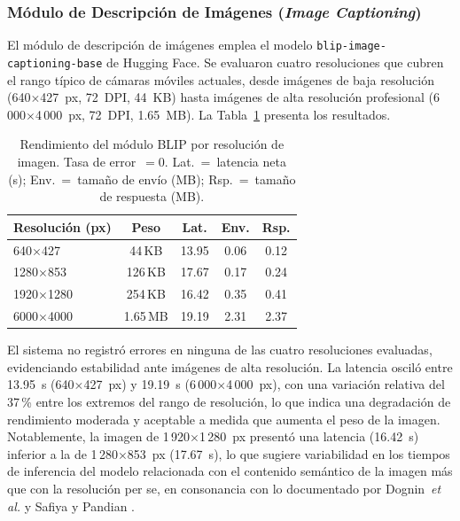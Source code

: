 \documentclass[journal]{IEEEtran}
\begin{document}
	\subsubsection{M\'odulo de Descripci\'on de Im\'agenes (\textit{Image Captioning})}
	El m\'odulo de descripci\'on de im\'agenes emplea el modelo \texttt{blip-image-captioning-base} de Hugging Face. Se evaluaron cuatro resoluciones que cubren el rango t\'ipico de c\'amaras m\'oviles actuales, desde im\'agenes de baja resoluci\'on (640$\times$427~px, 72~DPI, 44~KB) hasta im\'agenes de alta resoluci\'on profesional (6\,000$\times$4\,000~px, 72~DPI, 1.65~MB). La Tabla~\ref{tab:img} presenta los resultados.
	
	\begin{table}[!t]
		\caption{Rendimiento del m\'odulo BLIP por resoluci\'on de imagen. Tasa de error~$= 0$. Lat.~=~latencia neta (s); Env.~=~tama\~no de env\'io (MB); Rsp.~=~tama\~no de respuesta (MB).}
		\label{tab:img}
		\centering
		\renewcommand{\arraystretch}{1.25}
		\begin{tabular}{p{1.9cm}cccc}
			\toprule
			\textbf{Resoluci\'on (px)} & \textbf{Peso} & \textbf{Lat.} & \textbf{Env.} & \textbf{Rsp.} \\
			\midrule
			640$\times$427   & 44\,KB   & 13.95 & 0.06 & 0.12 \\
			1280$\times$853  & 126\,KB  & 17.67 & 0.17 & 0.24 \\
			1920$\times$1280 & 254\,KB  & 16.42 & 0.35 & 0.41 \\
			6000$\times$4000 & 1.65\,MB & 19.19 & 2.31 & 2.37 \\
			\bottomrule
		\end{tabular}
	\end{table}
	
	El sistema no registr\'o errores en ninguna de las cuatro resoluciones evaluadas, evidenciando estabilidad ante im\'agenes de alta resoluci\'on. La latencia oscil\'o entre 13.95~s (640$\times$427~px) y 19.19~s (6\,000$\times$4\,000~px), con una variaci\'on relativa del 37\,\% entre los extremos del rango de resoluci\'on, lo que indica una degradaci\'on de rendimiento moderada y aceptable a medida que aumenta el peso de la imagen. Notablemente, la imagen de 1\,920$\times$1\,280~px present\'o una latencia (16.42~s) inferior a la de 1\,280$\times$853~px (17.67~s), lo que sugiere variabilidad en los tiempos de inferencia del modelo relacionada con el contenido sem\'antico de la imagen m\'as que con la resoluci\'on per se, en consonancia con lo documentado por Dognin~\textit{et al.} \cite{dognin2021} y Safiya y Pandian \cite{safiya2024}.
	
\end{document}

